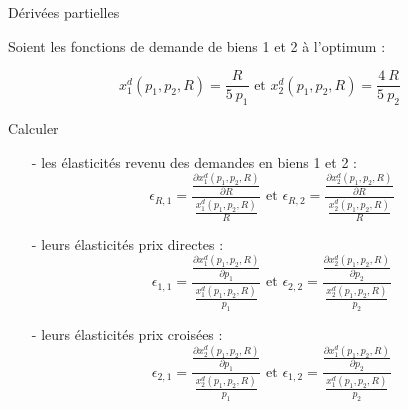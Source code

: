 \documentclass[9pt,handout,professionalfonts,hyperref]{beamer}
\begin{document}
\begin{frame}{Dérivées partielles}

Soient les fonctions de demande de biens 1 et 2 à l'optimum : 

$$x_1^d(p_1,p_2,R) = \frac{R}{5~p_1} \text{ et } x_2^d(p_1,p_2,R) = \frac{4~R}{5~p_2}$$

Calculer 

\begin{itemize}
	\item[-] les élasticités revenu des demandes en biens 1 et 2 : $$\epsilon_{R,1} 
	= \frac{\frac{\partial x_1^d(p_1,p_2,R)}{\partial R}}{\frac{x_1^d(p_1,p_2,R) }{R}}\text{ et } \epsilon_{R,2} 
	= \frac{\frac{\partial x_2^d(p_1,p_2,R)}{\partial R}}{\frac{x_2^d(p_1,p_2,R) }{R}}$$
	\item[-] leurs élasticités prix directes : $$\epsilon_{1,1} 
	= \frac{\frac{\partial x_1^d(p_1,p_2,R)}{\partial p_1}}{\frac{x_1^d(p_1,p_2,R) }{p_1}}\text{ et } \epsilon_{2,2} 
	= \frac{\frac{\partial x_2^d(p_1,p_2,R)}{\partial p_2}}{\frac{x_2^d(p_1,p_2,R) }{p_2}}$$
	\item[-] leurs élasticités prix croisées : $$\epsilon_{2,1} 
	= \frac{\frac{\partial x_2^d(p_1,p_2,R)}{\partial p_1}}{\frac{x_2^d(p_1,p_2,R) }{p_1}}\text{ et }\epsilon_{1,2} 
	= \frac{\frac{\partial x_1^d(p_1,p_2,R)}{\partial p_2}}{\frac{x_1^d(p_1,p_2,R) }{p_2}}$$
\end{itemize}

\end{frame}
\end{document}
